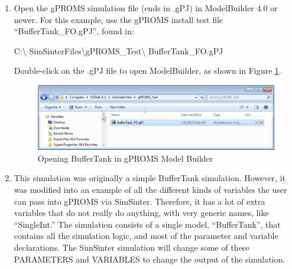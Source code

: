 \begin{enumerate}

\item Open the gPROMS simulation file (ends in .gPJ) in ModelBuilder
  4.0 or newer.  For this example, use the gPROMS install test
  file ``BufferTank\_FO.gPJ'', found in:

C:\textbackslash
  SimSinterFiles\textbackslash gPROMS\_Test\textbackslash
  BufferTank\_FO.gPJ

  Double-click on the .gPJ file to open  ModelBuilder, as shown in Figure \ref{fig.sinter.gproms.openbuffertank}.
\begin{figure}[H]
	\begin{center}
		\includegraphics[scale=0.55]{Chapt_sinter/figs/gPROMS/01_OpenBufferTank}
		\caption{Opening BufferTank in gPROMS Model Builder}
		\label{fig.sinter.gproms.openbuffertank}
	\end{center}
\end{figure}

\item This simulation was originally a simple BufferTank simulation.  However, it was modified into an example of all the different kinds of variables the user can pass into gPROMS via SimSinter.  Therefore, it has a lot of extra variables that do not really do anything, with very generic names, like ``SingleInt.''
The simulation consists of a single model, ``BufferTank'', that contains all the simulation logic, and most of the parameter and variable declarations.
The SimSinter simulation will change some of these PARAMETERS and VARIABLES to change the output of the simulation.


\end{enumerate}
